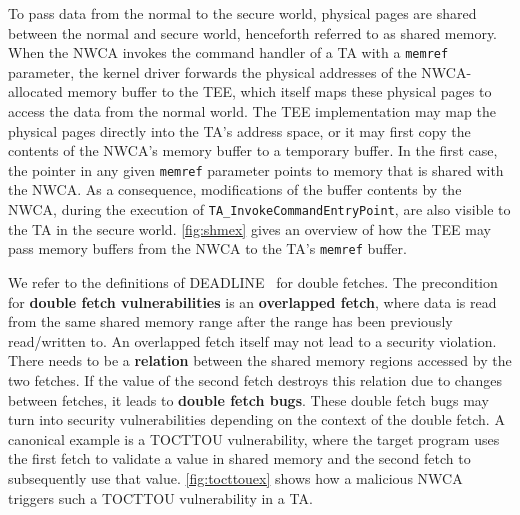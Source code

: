 \documentclass[conference]{IEEEtran} %
\providecommand{\DIFaddbegin}{} %
\providecommand{\DIFaddend}{} %
\begin{document}
\DIFaddend To pass data from the normal to the secure world, physical pages are shared 
between the normal and secure world, henceforth referred to as shared memory. 
When the NWCA invokes the command handler of a TA with a \texttt{memref} 
parameter, the kernel driver forwards the physical addresses of the NWCA-allocated 
memory buffer to the TEE, which itself maps these physical pages to access the data 
from the normal world. The TEE implementation may map 
the physical pages directly into the TA's address space, or it may first copy
the contents of the NWCA's memory buffer to a temporary buffer. In the first case, the 
pointer in any given \texttt{memref} parameter points to memory that is shared 
with the NWCA. As a consequence, modifications of the buffer contents by the NWCA, 
during the execution of \texttt{TA\_InvokeCommandEntryPoint}, are also visible to the 
TA in the secure world. \autoref{fig:shmex} gives an overview of how the TEE may pass 
memory buffers from the NWCA to the TA's \texttt{memref} buffer.

\DIFaddbegin \begin{listing}[h]
    \label{lst:exdf}
\end{listing}

\DIFaddend We refer to the definitions of \textsc{DEADLINE}~\cite{deadline} for double fetches.
The precondition for \textbf{double fetch vulnerabilities} is an \textbf{overlapped fetch}, where data 
is read from the same shared memory range after the range has been previously read/written to. 
An overlapped fetch itself may not lead to a security violation. There needs to be a \textbf{relation}
between the shared memory regions accessed by the two fetches. If the value of the second fetch 
destroys this relation due to changes between fetches, it leads to \textbf{double fetch bugs}.  
These double fetch bugs may turn into security vulnerabilities depending on the context of the 
double fetch. A canonical example is a TOCTTOU vulnerability, where the target program uses the 
first fetch to validate a value in shared memory and the second fetch to subsequently use that value. 
\autoref{fig:tocttouex} shows how a malicious NWCA triggers such a TOCTTOU vulnerability in a TA. 
\end{document}
